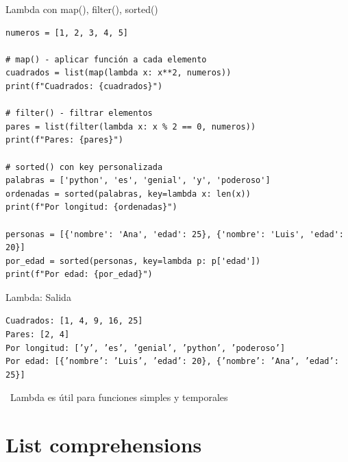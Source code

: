 \documentclass{beamer}
\begin{document}
\begin{frame}[fragile]{Lambda con map(), filter(), sorted() \faFilter}
\begin{lstlisting}
numeros = [1, 2, 3, 4, 5]

# map() - aplicar función a cada elemento
cuadrados = list(map(lambda x: x**2, numeros))
print(f"Cuadrados: {cuadrados}")

# filter() - filtrar elementos
pares = list(filter(lambda x: x % 2 == 0, numeros))
print(f"Pares: {pares}")

# sorted() con key personalizada
palabras = ['python', 'es', 'genial', 'y', 'poderoso']
ordenadas = sorted(palabras, key=lambda x: len(x))
print(f"Por longitud: {ordenadas}")

personas = [{'nombre': 'Ana', 'edad': 25}, {'nombre': 'Luis', 'edad': 20}]
por_edad = sorted(personas, key=lambda p: p['edad'])
print(f"Por edad: {por_edad}")
\end{lstlisting}
\end{frame}

\begin{frame}[fragile]{Lambda: Salida \faArrowCircleRight}
\begin{tcolorbox}[colback=green!10,colframe=green,title={\small\faArrowCircleRight \ Salida},coltitle=fg0,left=3pt,right=3pt,top=2pt,bottom=2pt,boxsep=1pt]
\tiny\texttt{Cuadrados: [1, 4, 9, 16, 25]\\
Pares: [2, 4]\\
Por longitud: ['y', 'es', 'genial', 'python', 'poderoso']\\
Por edad: [\{'nombre': 'Luis', 'edad': 20\}, \{'nombre': 'Ana', 'edad': 25\}]}
\end{tcolorbox}

\vspace{0.3cm}
\begin{notebox}
\small\faInfoCircle\ Lambda es útil para funciones simples y temporales
\end{notebox}
\end{frame}

\section{List comprehensions}
\end{document}
